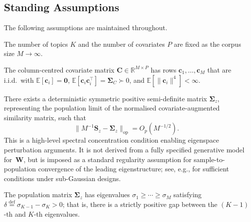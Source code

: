 \subsection{Standing Assumptions}
\label{subsec:assumptions}

The following assumptions are maintained throughout.

\begin{assumption}
\label{ass:fixed_dim}
The number of topics $K$ and the number of covariates $P$ are fixed
as the corpus size $M\to\infty$.
\end{assumption}

\begin{assumption}
\label{ass:covariates}
The column-centred covariate matrix
$\mathbf{C}\in\mathbb{R}^{M\times P}$ has rows
$\mathbf{c}_1,\dots,\mathbf{c}_M$ that are i.i.d.\ with
$\mathbb{E}[\mathbf{c}_i]=\mathbf{0}$,
$\mathbb{E}[\mathbf{c}_i\mathbf{c}_i^{\!\top}]
 = \boldsymbol{\Sigma}_C \succ 0$, and
$\mathbb{E}[\|\mathbf{c}_i\|^4]<\infty$.
\end{assumption}

\begin{assumption}
\label{ass:spectral_convergence}
There exists a deterministic symmetric positive semi-definite matrix
$\boldsymbol{\Sigma}_z$, representing the population limit of the
normalised covariate-augmented similarity matrix, such that
\begin{equation}
  \bigl\|M^{-1}\mathbf{S}_z
    - \boldsymbol{\Sigma}_z\bigr\|_{\mathrm{op}}
  = O_p(M^{-1/2}).
  \label{eq:spectral_convergence}
\end{equation}
This is a high-level spectral concentration condition enabling
eigenspace perturbation arguments. It is not derived from a fully
specified generative model for~$\mathbf{W}$, but is imposed as a
standard regularity assumption for sample-to-population convergence of
the leading eigenstructure; see, e.g.,
\citet{vershynin2012close} for sufficient conditions under
sub-Gaussian designs.
\end{assumption}

\begin{assumption}[Eigengap]
\label{ass:eigengap}
The population matrix $\boldsymbol{\Sigma}_z$ has eigenvalues
$\sigma_1\geq\cdots\geq\sigma_M$ satisfying
$\delta \stackrel{\text{def}}{=}
 \sigma_{K-1} - \sigma_K > 0$;
that is, there is a strictly positive gap between the $(K{-}1)$-th
and $K$-th eigenvalues.
\end{assumption}

